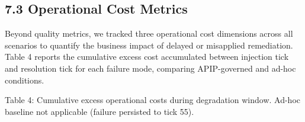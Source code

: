 \subsection{7.3  Operational Cost Metrics}

Beyond quality metrics, we tracked three operational cost dimensions across all scenarios to quantify the business impact of delayed or misapplied remediation. Table 4 reports the cumulative excess cost accumulated between injection tick and resolution tick for each failure mode, comparing APIP-governed and ad-hoc conditions.

Table 4: Cumulative excess operational costs during degradation window. \dag{} Ad-hoc baseline not applicable (failure persisted to tick 55).


